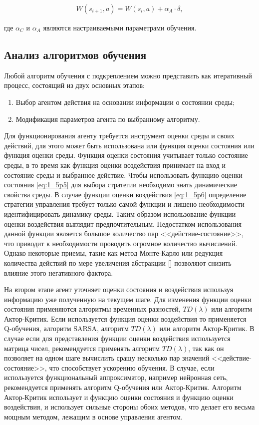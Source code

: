 \begin{equation}
\label{eq:1_6p8}
\begin{alignedat}{2}
W(s_{i+1}, a) = W(s_i, a) + \alpha_A\cdot\delta,
\end{alignedat}
\end{equation}

\noindent где $ \alpha_C $ и $ \alpha_A $ являются настраиваемыми параметрами обучения.

 
\subsection{Анализ алгоритмов обучения} \label{subsect1_6_7}

Любой алгоритм обучения с подкреплением можно представить как итеративный процесс, состоящий из двух основных этапов:

\begin{enumerate}
	\item Выбор агентом действия на основании информации о состоянии среды;
	\item Модификация параметров агента по выбранному алгоритму.
\end{enumerate}

Для функционирования агенту требуется инструмент оценки среды и своих действий, для этого может быть использована или функция оценки состояния или функция оценки среды. Функция оценки состояния учитывает только состояние среды, в то время как функция оценки воздействия принимает на вход и состояние среды и выбранное действие. Чтобы использовать функцию оценки состояния \ref{eq:1_5p5}  для выбора стратегии необходимо знать динамические свойства среды. В случае функции оценки воздействия \ref{eq:1_5p6} определение стратегии управления требует только самой функции и лишено необходимости идентифицировать динамику среды. Таким образом использование функции оценки воздействия выглядит предпочтительным. Недостатком использования данной функции является большое количество пар <<действие-состояние>>, что приводит к необходимости проводить огромное количество вычислений. Однако некоторые приемы, такие как метод Монте-Карло или редукция количества действий по мере увеличения абстракции [] позволяют снизить влияние этого негативного фактора.

На втором этапе агент уточняет оценки состояния и воздействия используя информацию уже полученную на текущем шаге. Для изменения функции оценки состояния применяются алгоритмы временных разностей, $ TD(\lambda) $ или алгоритм Актор-Критик. Если используется функция оценки воздействия то применяется Q-обучения, алгоритм SARSA, алгоритм $ TD(\lambda) $ или алгоритм Актор-Критик. В случае если для представления функции оценки воздействия используется матрица чисел, рекомендуется применять алгоритм $ TD(\lambda) $, так как он позволяет на одном шаге вычислить сращу несколько пар значений <<действие-состояние>>, что способствует ускорению обучения. В случае, если используется функциональный аппроксиматор, например нейронная сеть, рекомендуется применять алгоритм Q-обучения или Актор-Критик. Алгоритм Актор-Критик использует и функцию оценки состояния и функцию оценки воздействия, и использует сильные стороны обоих методов, что делает его весьма мощным методом, лежащим в основе управления агентом.

